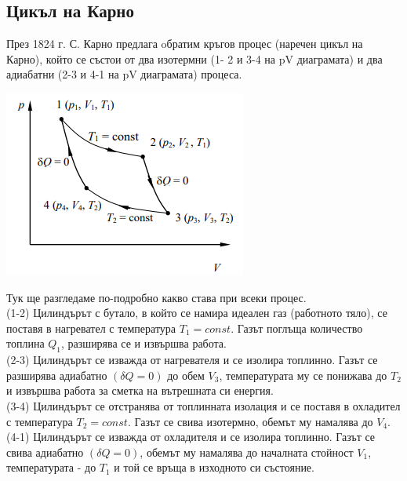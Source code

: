 \documentclass[fleqn, 12pt]{article}
\theoremstyle{definition}
\begin{document}
\subsection{Цикъл на Карно}
През 1824 г. С. Карно предлага oбратим кръгов процес (наречен цикъл на Карно), който се състои от два изотермни (1-
2 и 3-4 на pV диаграмата) и два адиабатни (2-3 и 4-1 на pV диаграмата) процеса.\\
\begin{center}
  \includegraphics[width = \linewidth]{Pics/physics/lec4-8.png}
\end{center}
Тук ще разгледаме по-подробно какво става при всеки процес.\\
(1-2) Цилиндърът с бутало, в който се намира идеален газ (работното тяло), се поставя в нагревател с температура $T_1 = const$. Газът поглъща количество топлина $Q_1$, разширява се и извършва работа. \\
(2-3) Цилиндърът се изважда от нагревателя и се изолира топлинно. Газът се
разширява адиабатно $(\delta Q = 0)$ до обем $V_3$, температурата му се понижава до $T_2$ и 
извършва работа за сметка на вътрешната си енергия.\\
(3-4) Цилиндърът се отстранява от топлинната изолация и се поставя в охладител
с температура $T_2 = const$. Газът се свива изотермно, обемът му намалява до $V_4$. \\
(4-1) Цилиндърът се изважда от охладителя и се изолира топлинно. Газът се
свива адиабатно $(\delta Q = 0)$, обемът му намалява до началната стойност $V_1$, температурата - до
$T_1$ и той се връща в изходното си състояние. \\
\end{document}
